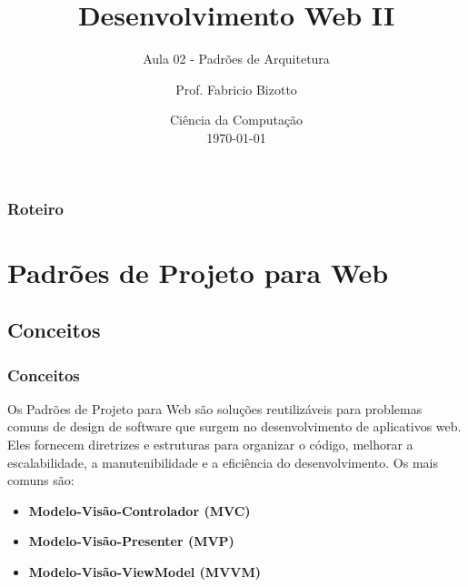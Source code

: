 \documentclass[
	9pt, %
	t, %
]{beamer}
\title[DesWebII]{Desenvolvimento Web II} %
\subtitle{Aula 02 - Padrões de Arquitetura} %
\author[Fabricio Bizotto]{Prof. Fabricio Bizotto} %
\institute[IFC]{Instituto Federal Catarinense \\ \smallskip \textit{fabricio.bizotto@ifc.edu.br}} %
\date[\today]{Ciência da Computação \\ \today} %
\begin{document}

\begin{frame}
	\titlepage %
\end{frame}


\begin{frame}
	\frametitle{Roteiro} %

	\tableofcontents %
\end{frame}


\section{Padrões de Projeto para Web} %


\subsection{Conceitos}

\begin{frame}
	\frametitle{Conceitos}

	Os \alert{Padrões de Projeto para Web} são soluções reutilizáveis para
	problemas comuns de design de software que surgem no desenvolvimento de
	aplicativos web. Eles fornecem \alert{diretrizes e estruturas} para organizar o
	código, melhorar a escalabilidade, a manutenibilidade e a eficiência do
	desenvolvimento. Os mais comuns são:

	\begin{itemize}
		\item \textbf{Modelo-Visão-Controlador (MVC)}
		\item \textbf{Modelo-Visão-Presenter (MVP)}
		\item \textbf{Modelo-Visão-ViewModel (MVVM)}
	\end{itemize}
\end{frame}
\end{document}
